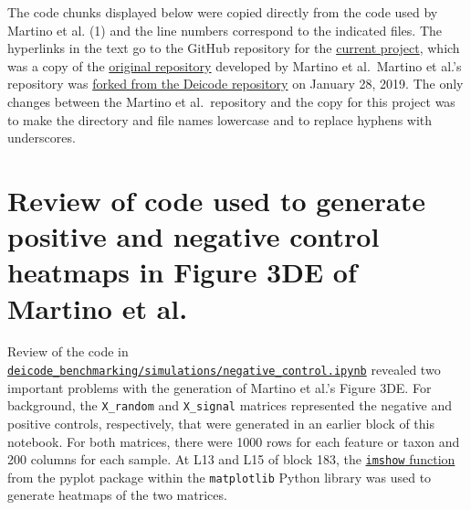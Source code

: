 \documentclass[
]{article}
\author{}
\date{}
\renewcommand*\contentsname{Table of contents}
\newcommand\contentsname{Table of contents}
\begin{document}

\renewcommand*\contentsname{Supplemental text: Review of Python code
from Martino et al.}
{
\hypersetup{linkcolor=}
\setcounter{tocdepth}{3}
\tableofcontents
}

\raggedright

The code chunks displayed below were copied directly from the code used
by Martino et al. (1) and the line numbers correspond to the indicated
files. The hyperlinks in the text go to the GitHub repository for the
\href{https://github.com/SchlossLab/Schloss_RPCA_mSystems_2026}{current
project}, which was a copy of the
\href{https://github.com/cameronmartino/deicode-benchmarking}{original
repository} developed by Martino et al.~Martino et al.'s repository was
\href{https://github.com/biocore/DEICODE/commit/ea7835b9a0d16c35685542a81d05ee12c412c6ba}{forked
from the Deicode repository} on January 28, 2019. The only changes
between the Martino et al.~repository and the copy for this project was
to make the directory and file names lowercase and to replace hyphens
with underscores.

\section{Review of code used to generate positive and negative control
heatmaps in Figure 3DE of Martino et
al.}\label{review-of-code-used-to-generate-positive-and-negative-control-heatmaps-in-figure-3de-of-martino-et-al.}

Review of the code in
\href{https://github.com/SchlossLab/Schloss_RPCA_mSystems_2026/blob/main/deicode_benchmarking/simulations/negative_control.ipynb}{\texttt{deicode\_benchmarking/simulations/negative\_control.ipynb}}
revealed two important problems with the generation of Martino et al.'s
Figure 3DE. For background, the \texttt{X\_random} and
\texttt{X\_signal} matrices represented the negative and positive
controls, respectively, that were generated in an earlier block of this
notebook. For both matrices, there were 1000 rows for each feature or
taxon and 200 columns for each sample. At L13 and L15 of block 183, the
\href{https://matplotlib.org/stable/api/_as_gen/matplotlib.pyplot.imshow.html}{\texttt{imshow}
function} from the pyplot package within the \texttt{matplotlib} Python
library was used to generate heatmaps of the two matrices.

\footnotesize
\end{document}
